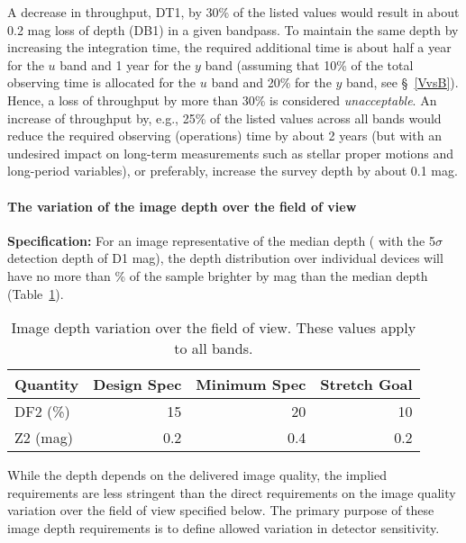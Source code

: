 A decrease in throughput, DT1, by 30\% of the listed
values would result in about 0.2 mag loss of depth (DB1) in a given bandpass.
To maintain the same depth by increasing the integration time, the required
additional time is about half a year for the $u$ band and 1 year for the
$y$ band (assuming that 10\% of the total observing time is allocated for
the $u$ band and 20\% for the $y$ band, see \S~\ref{VvsB}). Hence, a
loss of throughput by more than 30\% is considered {\it unacceptable}.
An increase of throughput by, e.g., 25\% of the listed values across all bands
would reduce the required observing (operations) time by about 2 years (but with
an undesired impact on long-term measurements such as stellar proper
motions and long-period variables), or preferably, increase the survey
depth by about 0.1 mag.



\paragraph{The variation of the image depth over the field of view\\}

{\bf Specification:} For an image representative of the median depth (\ie
 with the 5$\sigma$ detection depth of D1 mag), the depth distribution
over individual devices will have no more than
\% of the sample brighter by
mag than the median depth (Table~\ref{depthVarFOV}).

\begin{table}[h]
\begin{tabular}{|l|r|r|r|}
\hline
Quantity   & Design Spec & Minimum Spec & Stretch Goal       \\
\hline
      DF2 (\%) &    15       &      20     &      10         \\
      Z2 (mag) &    0.2      &      0.4    &     0.2         \\
\hline
\end{tabular}
\caption{Image depth variation over the field of view. These values
apply to all bands.}
\label{depthVarFOV}
\end{table}

While the depth depends on the delivered image quality, the implied
requirements are less stringent than the direct requirements on the image
quality variation over the field of view specified below.  The primary
purpose of these image depth requirements is to define allowed variation in
detector sensitivity.

